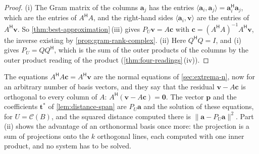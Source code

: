 \begin{proof}
(i) The Gram matrix of the columns $\mathbf a_j$ has the entries $\langle\mathbf a_i,\mathbf a_j\rangle=\mathbf a_i^{\mathsf H}\mathbf a_j$, which are the entries of $A^{\mathsf H}A$, and the right-hand sides $\langle\mathbf a_i,\mathbf v\rangle$ are the entries of $A^{\mathsf H}\mathbf v$. So \cref{thm:best-approximation}\,(iii) gives $P_U\mathbf v=A\mathbf c$ with $\mathbf c=(A^{\mathsf H}A)^{-1}A^{\mathsf H}\mathbf v$, the inverse existing by \cref{prop:gram-rank-complex}. (ii) Here $Q^{\mathsf H}Q=I$, and (i) gives $P_U=QQ^{\mathsf H}$, which is the sum of the outer products of the columns by the outer product reading of the product (\cref{thm:four-readings}\,(iv)).
\end{proof}

The equations $A^{\mathsf H}A\mathbf c=A^{\mathsf H}\mathbf v$ are the normal equations of \cref{sec:extrema-n}, now for an arbitrary number of basis vectors, and they say that the residual $\mathbf v-A\mathbf c$ is orthogonal to every column of $A$: $A^{\mathsf H}(\mathbf v-A\mathbf c)=\mathbf 0$. The vector $\mathbf p$ and the coefficients $\mathbf t^*$ of \cref{lem:distance-span} are $P_U\mathbf a$ and the solution of these equations, for $U=\mathcal C(B)$, and the squared distance computed there is $\|\mathbf a-P_U\mathbf a\|^2$. Part (ii) shows the advantage of an orthonormal basis once more: the projection is a sum of projections onto the $k$ orthogonal lines, each computed with one inner product, and no system has to be solved.

